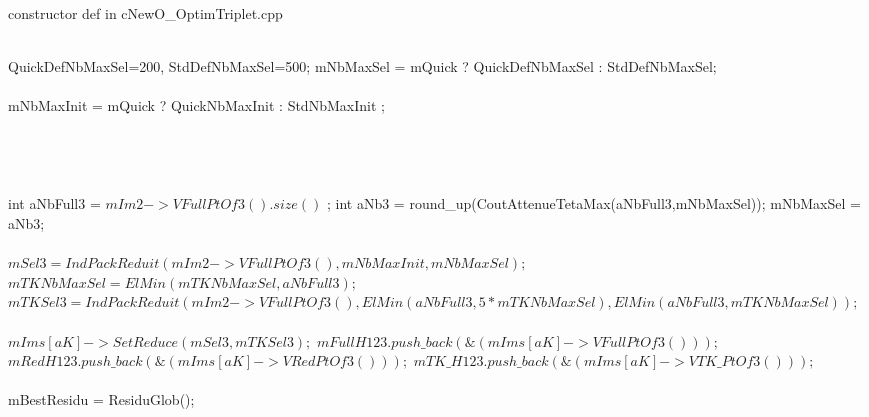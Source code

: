 \begin{algorithm}
\caption{ constructor def in cNewO\_OptimTriplet.cpp  }
\begin{algorithmic}
\State 
\\
\Comment {}
\State QuickDefNbMaxSel=200, StdDefNbMaxSel=500;
 \State    mNbMaxSel = mQuick ? QuickDefNbMaxSel : StdDefNbMaxSel;
 \\ 
\\
\State mNbMaxInit = mQuick ? QuickNbMaxInit   : StdNbMaxInit ;
\\
\\
\Comment{}\\
\Comment {}\\
\Comment {}
\\
\Comment {}
\State int aNbFull3 = $mIm2->VFullPtOf3().size()$ ;
\State    int aNb3 = round\_up(CoutAttenueTetaMax(aNbFull3,mNbMaxSel));
\State    mNbMaxSel = aNb3;
\\
\\
\Comment {}
\State $mSel3 = IndPackReduit(mIm2->VFullPtOf3(),mNbMaxInit,mNbMaxSel);$
\\
\Comment {}
\State $mTKNbMaxSel = ElMin(mTKNbMaxSel,aNbFull3);$
\State   $mTKSel3 = IndPackReduit(mIm2->VFullPtOf3(),ElMin(aNbFull3,5*mTKNbMaxSel),ElMin(aNbFull3,mTKNbMaxSel));$
\\
\\
\Comment {}
\State $mIms[aK]->SetReduce(mSel3,mTKSel3);$
\State  $mFullH123.push\_back(\&(mIms[aK]->VFullPtOf3()));$
\State  $mRedH123.push\_back(\&(mIms[aK]->VRedPtOf3()));$
\State  $mTK\_H123.push\_back(\&(mIms[aK]->VTK\_PtOf3()));$
\\
\\
\Comment {}
\State mBestResidu =  ResiduGlob();

\end{algorithmic}
\end{algorithm}
